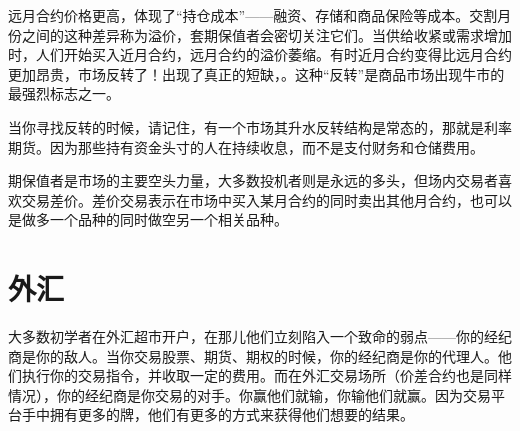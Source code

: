 远月合约价格更高，体现了“持仓成本”——融资、存储和商品保险等成本。交割月份之间的这种差异称为溢价，套期保值者会密切关注它们。当供给收紧或需求增加时，人们开始买入近月合约，远月合约的溢价萎缩。有时近月合约变得比远月合约更加昂贵，市场反转了！出现了真正的短缺，。这种“反转”是商品市场出现牛市的最强烈标志之一。

当你寻找反转的时候，请记住，有一个市场其升水反转结构是常态的，那就是利率期货。因为那些持有资金头寸的人在持续收息，而不是支付财务和仓储费用。

期保值者是市场的主要空头力量，大多数投机者则是永远的多头，但场内交易者喜欢交易差价。差价交易表示在市场中买入某月合约的同时卖出其他月合约，也可以是做多一个品种的同时做空另一个相关品种。
\section{外汇}
大多数初学者在外汇超市开户，在那儿他们立刻陷入一个致命的弱点——你的经纪商是你的敌人。当你交易股票、期货、期权的时候，你的经纪商是你的代理人。他们执行你的交易指令，并收取一定的费用。而在外汇交易场所（价差合约也是同样情况），你的经纪商是你交易的对手。你赢他们就输，你输他们就赢。因为交易平台手中拥有更多的牌，他们有更多的方式来获得他们想要的结果。